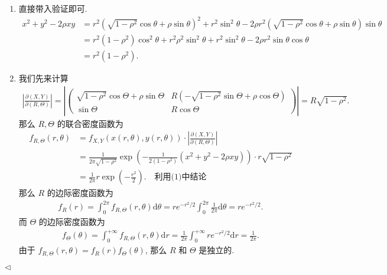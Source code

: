\documentclass[11pt]{article}
\newenvironment{answer}[1][Solution]{\begin{trivlist}
    \item[\hskip \labelsep {\bfseries #1.}\hskip \labelsep]}{\hfill$\lhd$\end{trivlist}}
\newcommand\1{\mathds{1}}
\newcommand\dd{\mathrm{d}}
\begin{document}
\begin{answer}
    \begin{enumerate}[label=(\arabic*)]
        \item 直接带入验证即可.
        \begin{align*}
            x^2 + y^2 - 2\rho xy &= r^2\left(\sqrt{1-\rho^2} \cos\theta + \rho \sin\theta\right)^2 + r^2 \sin^2\theta - 2\rho r^2 \left(\sqrt{1-\rho^2} \cos\theta + \rho \sin\theta\right)\sin\theta \\
            &= r^2(1-\rho^2)\cos^2\theta + r^2\rho^2\sin^2\theta + r^2\sin^2\theta - 2\rho r^2 \sin\theta\cos\theta \\
            &= r^2(1-\rho^2).
        \end{align*}
        \item 我们先来计算
        \begin{align*}
            \left|\frac{\partial(X, Y)}{\partial(R,\Theta)}\right| = \left| \begin{pmatrix}
                \sqrt{1-\rho^2}\cos\Theta + \rho\sin\Theta & R(-\sqrt{1-\rho^2}\sin\Theta + \rho\cos\Theta) \\
                \sin\Theta & R\cos\Theta 
            \end{pmatrix}\right| = R\sqrt{1-\rho^2}.
        \end{align*}
        那么 $R, \Theta$ 的联合密度函数为
        \begin{align*}
            f_{R,\Theta}(r,\theta) &= f_{X,Y}(x(r,\theta),y(r,\theta)) \cdot \left|\frac{\partial(X, Y)}{\partial(R,\Theta)}\right| \\
            &= \frac{1}{2\pi\sqrt{1-\rho^2}} \exp\left(-\frac{1}{2(1-\rho^2) }(x^2 + y^2 -2\rho xy)\right) \cdot r \sqrt{1-\rho^2} \\
            &= \frac{1}{2\pi} r \exp\left(-\frac{r^2}{2}\right). \quad \text{利用(1)中结论}
        \end{align*}
        那么 $R$ 的边际密度函数为
        \begin{align*}
            f_R(r) = \int_{0}^{2\pi} f_{R,\Theta}(r,\theta) \dd \theta = r e^{-r^2/2} \int_{0}^{2\pi} \frac{1}{2\pi} \dd \theta = r e^{-r^2/2}.
        \end{align*}
        而 $\Theta$ 的边际密度函数为
        \begin{align*}
            f_{\Theta}(\theta) = \int_{0}^{+\infty} f_{R,\Theta}(r,\theta) \dd r = \frac{1}{2\pi} \int_{0}^{+\infty} r e^{-r^2/2} \dd r = \frac{1}{2\pi}.
        \end{align*}
        由于 $f_{R,\Theta}(r,\theta) = f_R(r) f_{\Theta}(\theta)$, 那么 $R$ 和 $\Theta$ 是独立的.

\end{enumerate}
\end{answer}
\end{document}
